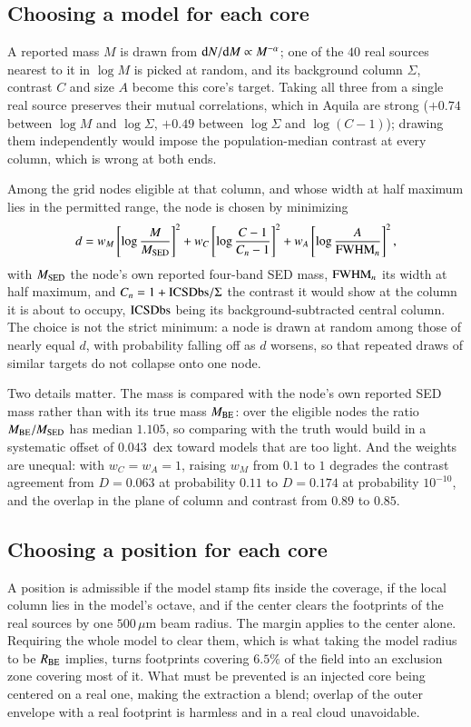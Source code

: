 \documentclass{aa}
\newcommand{\Rbe}{R_{\rm BE}}
\newcommand{\Mbe}{M_{\rm BE}}
\newcommand{\Msed}{M_{\rm SED}}
\begin{document}
\subsection{Choosing a model for each core}
A reported mass $M$ is drawn from
${\rm d}N/{\rm d}M \propto M^{-\alpha}$; one of the $40$ real sources
nearest to it in $\log M$ is picked at random, and its background column
$\Sigma$, contrast $C$ and size $A$ become this core's target. Taking all
three from a single real source preserves their mutual correlations, which in
Aquila are strong ($+0.74$ between $\log M$ and $\log\Sigma$, $+0.49$ between
$\log\Sigma$ and $\log(C-1)$); drawing them independently would impose the
population-median contrast at every column, which is wrong at both ends.

Among the grid nodes eligible at that column, and whose width at half maximum
lies in the permitted range, the node is chosen by minimizing
\begin{equation}
  d = w_{M}\left[\log\frac{M}{\Msed}\right]^{2}
    + w_{C}\left[\log\frac{C-1}{C_{n}-1}\right]^{2}
    + w_{A}\left[\log\frac{A}{{\rm FWHM}_{n}}\right]^{2},
  \label{eq:injscore}
\end{equation}
with $\Msed$ the node's own reported four-band SED mass,
${\rm FWHM}_{n}$ its width at half maximum, and
$C_{n} = 1 + {\rm ICSDbs}/\Sigma$ the contrast it would show at the column
it is about to occupy, ${\rm ICSDbs}$ being its background-subtracted
central column. The choice is not the strict minimum: a node is drawn at
random among those of nearly equal $d$, with probability falling off as $d$
worsens, so that repeated draws of similar targets do not collapse onto one
node.

Two details matter. The mass is compared with the node's own reported SED mass
rather than with its true mass $\Mbe$: over the eligible nodes the
ratio $\Mbe/\Msed$ has median $1.105$, so comparing with
the truth would build in a systematic offset of $0.043$~dex toward models that
are too light. And the weights are unequal: with $w_{C}=w_{A}=1$, raising
$w_{M}$ from $0.1$ to $1$ degrades the contrast agreement from $D=0.063$ at
probability $0.11$ to $D=0.174$ at probability $10^{-10}$, and the overlap in
the plane of column and contrast from $0.89$ to $0.85$.

\subsection{Choosing a position for each core}
A position is admissible if the model stamp fits
inside the coverage, if the local column lies in the model's octave, and if
the center clears the footprints of the real sources by one $500\,\mu$m beam
radius. The margin applies to the center alone. Requiring the whole model to
clear them, which is what taking the model radius to be $\Rbe$ implies, turns
footprints covering $6.5\%$ of the field into an exclusion zone covering most
of it. What must be prevented is an injected core being centered on a real
one, making the extraction a blend; overlap of the outer envelope with a real
footprint is harmless and in a real cloud unavoidable.
\end{document}
